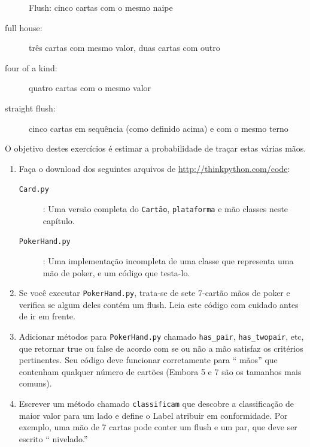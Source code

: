 \documentclass[10pt]{book}
\begin{document}
\begin{v erbatim}
\begin{}
\begin{description}
\item[] Flush: cinco cartas com o mesmo naipe
\Vspace {-0.05in}

\item[full house:] três cartas com mesmo valor, duas cartas com outro
\Vspace {-0.05in}

\item[four of a kind:] quatro cartas com o mesmo valor
\Vspace {-0.05in}

\item[straight flush:] cinco cartas em sequência (como definido acima) e
com o mesmo terno
\Vspace {-0.05in}

\end{description}
%
O objetivo destes exercícios é estimar
a probabilidade de traçar estas várias mãos.

\begin{enumerate}

\item Faça o download dos seguintes arquivos de \url{http://thinkpython.com/code}:

\begin{description}

\item[{\tt Card.py}]: Uma versão completa do {\tt Cartão},
{\tt plataforma} e {mão \tt} classes neste capítulo.

\item[{\tt PokerHand.py}]: Uma implementação incompleta de uma classe
que representa uma mão de poker, e um código que testa-lo.

\end{description}
%
\item Se você executar {\tt PokerHand.py}, trata-se de sete 7-cartão mãos de poker
e verifica se algum deles contém um flush. Leia este
código com cuidado antes de ir em frente.

\item Adicionar métodos para {\tt PokerHand.py} chamado \verb "has_pair",
\Verb "has_twopair", etc, que retornar true ou false de acordo com
se ou não a mão satisfaz os critérios pertinentes. Seu código deve
funcionar corretamente para `` mãos'' que contenham qualquer número de cartões
(Embora 5 e 7 são os tamanhos mais comuns).

\item Escrever um método chamado {\tt classificam} que descobre
a classificação de maior valor para um lado e define o
{Label \tt} atribuir em conformidade. Por exemplo, uma mão de 7 cartas
pode conter um flush e um par, que deve ser escrito `` nivelado.''


\end{enumerate}
\end{}
\end{v erbatim}
\end{document}
